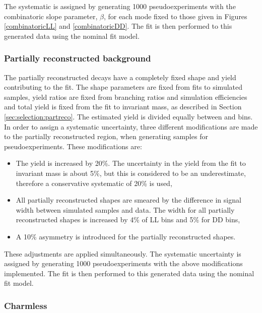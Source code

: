 The systematic is assigned by generating 1000 pseudoexperiments with the combinatoric slope parameter, $\beta$, for each \Dz mode fixed to those given in Figures \ref{combinatoricLL} and \ref{combinatoricDD}. The fit is then performed to this generated data using the nominal fit model.

\subsubsection{Partially reconstructed background}
\label{sec:systematics:partreco}

The partially reconstructed decays have a completely fixed shape and yield contributing to the \CP fit. The shape parameters are fixed from fits to simulated samples, yield ratios are fixed from branching ratios and simulation efficiencies and total yield is fixed from the fit to \kpi invariant mass, as described in Section \ref{sec:selection:partreco}. The estimated yield is divided equally between \Bp and \Bm bins. In order to assign a systematic uncertainty, three different modifications are made to the partially reconstructed region, when generating samples for pseudoexperiments. These modifications are:

\begin{itemize}
\item The yield is increased by 20\%. The uncertainty in the yield from the fit to \kpi invariant mass is about 5\%, but this is considered to be an underestimate, therefore a conservative systematic of 20\% is used,
\item All partially reconstructed shapes are smeared by the difference in signal width between simulated samples and data. The width for all partially reconstructed shapes is increased by 4\% of LL bins and 5\% for DD bins,
\item A 10\% asymmetry is introduced for the partially reconstructed shapes.
\end{itemize}

These adjustments are applied simultaneously. The systematic uncertainty is assigned by generating 1000 pseudoexperiments with the above modifications implemented. The fit is then performed to this generated data using the nominal fit model.

\subsubsection{Charmless}

